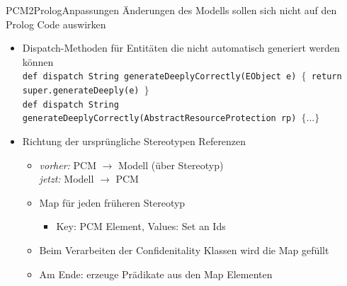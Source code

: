 \documentclass{sdqbeamer}
\begin{document}
\begin{frame}{PCM2Prolog}{Anpassungen}
	Änderungen des Modells sollen sich nicht auf den Prolog Code auswirken
	\vspace{0.05\textheight}
	\begin{itemize}
		\item Dispatch-Methoden für Entitäten die nicht automatisch generiert werden können \\ \vspace{0.025\textheight}
		\texttt{def dispatch String generateDeeplyCorrectly(EObject e) $\{$
				return super.generateDeeply(e)
		$\}$}\\
		\texttt{def dispatch String generateDeeplyCorrectly(AbstractResourceProtection rp) $\{...\}$} \\ \vspace{0.025\textheight}
		\item Richtung der ursprüngliche Stereotypen Referenzen
		\begin{itemize}
			\item \textit{vorher:} PCM $\rightarrow$ Modell (über Stereotyp) \\
			\textit{jetzt:}\hspace{0.019\textwidth} Modell $\rightarrow$ PCM
			\vspace{0.02\textheight}
			\item Map für jeden früheren Stereotyp
			\begin{itemize}
				\item Key: PCM Element, Values: Set an Ids
			\end{itemize}
			\item Beim Verarbeiten der Confidenitality Klassen wird die Map gefüllt
			\item Am Ende: erzeuge Prädikate aus den Map Elementen
		\end{itemize}
	\end{itemize}
\end{frame}
\end{document}
